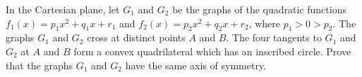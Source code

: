 In the Cartesian plane, let $G_1$ and $G_2$ be the graphs of the quadratic functions $f_1(x) = p_1x^2 + q_1x + r_1$ and $f_2(x) = p_2x^2 + q_2x + r_2$, where $p_1 > 0 > p_2$.
The graphs $G_1$ and $G_2$ cross at distinct points $A$ and $B$.
The four tangents to $G_1$ and $G_2$ at $A$ and $B$ form a convex quadrilateral which has an inscribed circle.
Prove that the graphs $G_1$ and $G_2$ have the same axis of symmetry.

